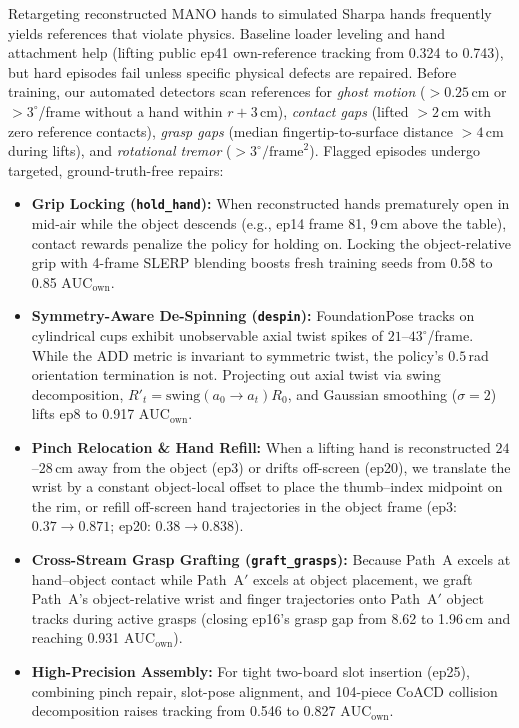 \documentclass[10pt]{nvidiaextabstract}
\newcommand{\ownauc}{\ensuremath{\mathrm{AUC}_{\text{own}}}\xspace}
\begin{document}
Retargeting reconstructed MANO hands to simulated Sharpa hands frequently yields references that violate physics. Baseline loader leveling and hand attachment help (lifting public ep41 own-reference tracking from 0.324 to 0.743), but hard episodes fail unless specific physical defects are repaired. Before training, our automated detectors scan references for \emph{ghost motion} ($>0.25$\,cm or $>3^\circ$/frame without a hand within $r+3$\,cm), \emph{contact gaps} (lifted $>2$\,cm with zero reference contacts), \emph{grasp gaps} (median fingertip-to-surface distance $>4$\,cm during lifts), and \emph{rotational tremor} ($>3^\circ/\text{frame}^2$). Flagged episodes undergo targeted, ground-truth-free repairs:
\begin{itemize}\setlength{\itemsep}{1pt}\setlength{\parskip}{0pt}
  \item \textbf{Grip Locking (\texttt{hold\_hand}):} When reconstructed hands prematurely open in mid-air while the object descends (e.g., ep14 frame 81, 9\,cm above the table), contact rewards penalize the policy for holding on. Locking the object-relative grip with 4-frame SLERP blending boosts fresh training seeds from 0.58 to 0.85 \ownauc.
  \item \textbf{Symmetry-Aware De-Spinning (\texttt{despin}):} FoundationPose tracks on cylindrical cups exhibit unobservable axial twist spikes of $21$--$43^\circ$/frame. While the ADD metric is invariant to symmetric twist, the policy's $0.5$\,rad orientation termination is not. Projecting out axial twist via swing decomposition, $R'_t = \mathrm{swing}(a_0 \rightarrow a_t)R_0$, and Gaussian smoothing ($\sigma=2$) lifts ep8 to 0.917 \ownauc.
  \item \textbf{Pinch Relocation \& Hand Refill:} When a lifting hand is reconstructed $24$--$28$\,cm away from the object (ep3) or drifts off-screen (ep20), we translate the wrist by a constant object-local offset to place the thumb--index midpoint on the rim, or refill off-screen hand trajectories in the object frame (ep3: $0.37 \rightarrow 0.871$; ep20: $0.38 \rightarrow 0.838$).
  \item \textbf{Cross-Stream Grasp Grafting (\texttt{graft\_grasps}):} Because Path~A excels at hand--object contact while Path~A$'$ excels at object placement, we graft Path~A's object-relative wrist and finger trajectories onto Path~A$'$ object tracks during active grasps (closing ep16's grasp gap from 8.62 to 1.96\,cm and reaching 0.931 \ownauc).
  \item \textbf{High-Precision Assembly:} For tight two-board slot insertion (ep25), combining pinch repair, slot-pose alignment, and 104-piece CoACD collision decomposition raises tracking from 0.546 to 0.827 \ownauc.
\end{itemize}
\end{document}
